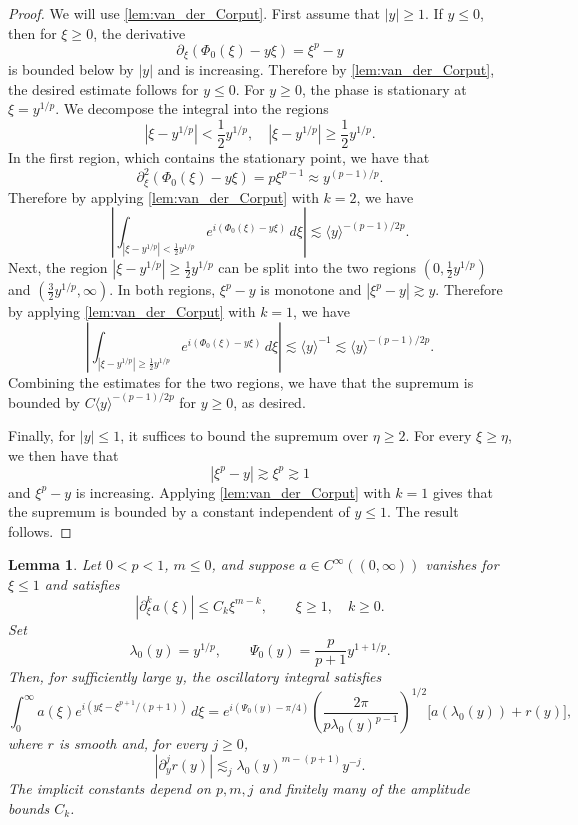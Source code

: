 \documentclass[11pt]{amsart}
\newtheorem{lemma}[theorem]{Lemma}
\theoremstyle{definition}
\theoremstyle{remark}
\numberwithin{equation}{section}
\newcommand{\ang}[1]{\langle #1 \rangle}
\begin{document}
\begin{proof}
    We will use \cref{lem:van_der_Corput}. First assume that $|y| \geq 1$. If $y \leq 0$, then for $\xi \geq 0$, the derivative 
    \[\partial_\xi(\Phi_0(\xi) - y\xi) = \xi^{p} - y\]
    is bounded below by $|y|$ and is increasing. Therefore by \cref{lem:van_der_Corput}, the desired estimate follows for $y \leq 0$. For $y \geq 0$, the phase is stationary at $\xi = y^{1/p}$. We decompose the integral into the regions
    \[|\xi - y^{1/p}| < \frac{1}{2} y^{1/p}, \quad |\xi - y^{1/p}| \geq \frac{1}{2} y^{1/p}.\]
    In the first region, which contains the stationary point, we have that 
    \[\partial^2_\xi(\Phi_0(\xi) - y\xi) = p\xi^{p-1} \approx y^{(p-1)/p}.\]
    Therefore by applying \cref{lem:van_der_Corput} with $k = 2$, we have 
    \[\left|\int_{|\xi - y^{1/p}| < \frac{1}{2} y^{1/p}} e^{i(\Phi_0(\xi) - y\xi)}\,d\xi\right| \lesssim \ang{y}^{-(p-1)/2p}.\]
    Next, the region $|\xi - y^{1/p}| \geq \frac{1}{2} y^{1/p}$ can be split into the two regions $(0, \frac{1}{2} y^{1/p})$ and $(\frac{3}{2} y^{1/p}, \infty)$. In both regions, $\xi^p - y$ is monotone and $|\xi^p - y| \gtrsim y$. Therefore by applying \cref{lem:van_der_Corput} with $k = 1$, we have
    \[\left|\int_{|\xi - y^{1/p}| \geq \frac{1}{2} y^{1/p}} e^{i(\Phi_0(\xi) - y\xi)}\,d\xi\right| \lesssim \ang{y}^{-1} \lesssim \ang{y}^{-(p-1)/2p}.\]
    Combining the estimates for the two regions, we have that the supremum is bounded by $C\ang{y}^{-(p-1)/2p}$ for $y \geq 0$, as desired. \par Finally, for $|y| \leq 1$, it suffices to bound the supremum over $\eta \geq 2$. For every $\xi \geq \eta$, we then have that 
    \[|\xi^{p} - y| \gtrsim \xi^p \gtrsim 1\]
    and $\xi^p - y$ is increasing. Applying \cref{lem:van_der_Corput} with $k = 1$ gives that the supremum is bounded by a constant independent of $y \leq 1$. The result follows.
\end{proof}

\begin{lemma}\label{lem:appendix_homogeneous_stationary_phase}
    Let $0<p<1$, $m \leq 0$, and suppose $a\in C^\infty((0,\infty))$ vanishes for $\xi\leq1$ and satisfies
    \[
        |\partial_\xi^k a(\xi)|\leq C_k\xi^{m-k},
        \qquad \xi\geq1,\quad k\geq0.
    \]
    Set
    \[
        \lambda_0(y)=y^{1/p},\qquad
        \Psi_0(y)=\frac{p}{p+1}y^{1+1/p}.
    \]
    Then, for sufficiently large $y$, the oscillatory integral satisfies
    \begin{equation}\label{eqn:appendix_homogeneous_stationary_expansion}
        \int_0^\infty a(\xi)e^{i(y\xi-\xi^{p+1}/(p+1))}\,d\xi
        =
        e^{i(\Psi_0(y)-\pi/4)}
        \left(\frac{2\pi}{p\lambda_0(y)^{p-1}}\right)^{1/2}
        \bigl[a(\lambda_0(y))+r(y)\bigr],
    \end{equation}
    where $r$ is smooth and, for every $j\geq0$,
    \begin{equation}\label{eqn:appendix_homogeneous_stationary_remainder}
        |\partial_y^j r(y)|
        \lesssim_j \lambda_0(y)^{m-(p+1)}y^{-j}.
    \end{equation}
    The implicit constants depend on $p,m,j$ and finitely many of the amplitude bounds $C_k$.
\end{lemma}
\end{document}
